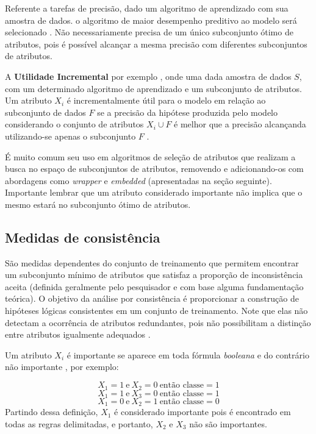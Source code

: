 \documentclass[
  openany]{book}
\begin{document}
Referente a tarefas de precisão, dado um algoritmo de aprendizado com sua amostra de dados. o algoritmo de maior desempenho preditivo ao modelo será selecionado \citep{kohavi1997wrappers}. Não necessariamente precisa de um único subconjunto ótimo de atributos, pois é possível alcançar a mesma precisão com diferentes subconjuntos de atributos.

A \textbf{Utilidade Incremental} por exemplo \citep{caruana1994useful}, onde uma dada amostra de dados \(S\), com um determinado algoritmo de aprendizado e um subconjunto de atributos. Um atributo \(X_i\) é incrementalmente útil para o modelo em relação ao subconjunto de dados \(F\) se a precisão da hipótese produzida pelo modelo considerando o conjunto de atributos \(X_i \cup F\) é melhor que a precisão alcançanda utilizando-se apenas o subconjunto \(F\) \citep{lee2005seleccao}.

É muito comum seu uso em algoritmos de seleção de atributos que realizam a busca no espaço de subconjuntos de atributos, removendo e adicionando-os com abordagens como \emph{wrapper} e \emph{embedded} (apresentadas na seção seguinte). Importante lembrar que um atributo considerado importante não implica que o mesmo estará no subconjunto ótimo de atributos.

\hypertarget{medidas-de-consistuxeancia}{%
\subsection{Medidas de consistência}\label{medidas-de-consistuxeancia}}

São medidas dependentes do conjunto de treinamento que permitem encontrar um subconjunto mínimo de atributos que satisfaz a proporção de inconsistência aceita (definida geralmente pelo pesquisador e com base alguma fundamentação teórica). O objetivo da análise por consistência é proporcionar a construção de hipóteses lógicas consistentes em um conjunto de treinamento. Note que elas não detectam a ocorrência de atributos redundantes, pois não possibilitam a distinção entre atributos igualmente adequados \citep{parmezan2012avaliaccao}.

Um atributo \(X_i\) é importante se aparece em toda fórmula \emph{booleana} e do contrário não importante \citep{almuallim1994learning, lee2005seleccao}, por exemplo:

\[X_1=1 \ \mbox{e} \ X_2=0 \ \mbox{então classe}=1\]
\[X_1=1 \ \mbox{e} \ X_3=0 \ \mbox{então classe}=1\]
\[X_1=0 \ \mbox{e} \ X_2=1 \ \mbox{então classe}=0\]
Partindo dessa definição, \(X_1\) é considerado importante pois é encontrado em todas as regras delimitadas, e portanto, \(X_2\) e \(X_3\) não são importantes.
\end{document}
